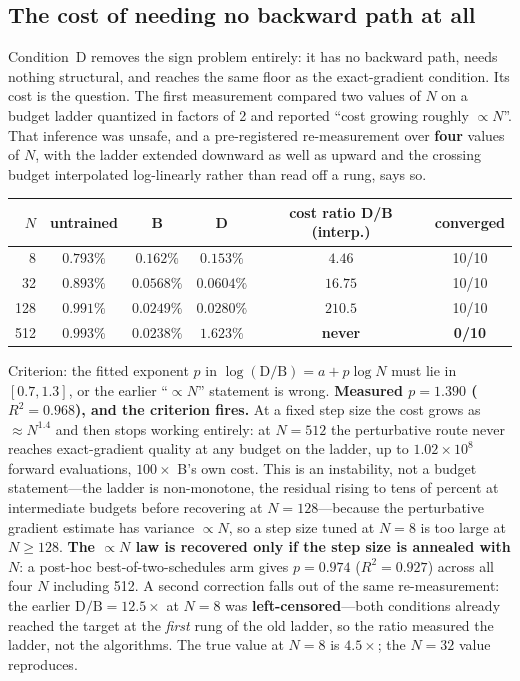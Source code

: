 \documentclass[11pt]{article}
\begin{document}
\subsection{The cost of needing no backward path at all}
\label{sec:pertcost}

Condition~D removes the sign problem entirely: it has no backward path, needs nothing structural, and reaches the same floor as the exact-gradient condition. Its cost is the question. The first measurement compared two values of $N$ on a budget ladder quantized in factors of 2 and reported ``cost growing roughly $\propto N$''. That inference was unsafe, and a pre-registered re-measurement over \textbf{four} values of $N$, with the ladder extended downward as well as upward and the crossing budget interpolated log-linearly rather than read off a rung, says so.

\begin{center}
\footnotesize
\begin{tabular}{rccccc}
\toprule
$N$ & untrained & B & D & cost ratio D/B (interp.) & converged \\
\midrule
8 & $0.793\%$ & $0.162\%$ & $0.153\%$ & $\mathbf{4.46}$ & 10/10 \\
32 & $0.893\%$ & $0.0568\%$ & $0.0604\%$ & $16.75$ & 10/10 \\
128 & $0.991\%$ & $0.0249\%$ & $0.0280\%$ & $210.5$ & 10/10 \\
512 & $0.993\%$ & $0.0238\%$ & $1.623\%$ & \textbf{never} & \textbf{0/10} \\
\bottomrule
\end{tabular}
\end{center}

Criterion: the fitted exponent $p$ in $\log(\mathrm{D/B}) = a + p\log N$ must lie in $[0.7, 1.3]$, or the earlier ``$\propto N$'' statement is wrong. \textbf{Measured $p = 1.390$ ($R^2 = 0.968$), and the criterion fires.} At a fixed step size the cost grows as ${\approx}N^{1.4}$ and then stops working entirely: at $N = 512$ the perturbative route never reaches exact-gradient quality at any budget on the ladder, up to $1.02\times10^8$ forward evaluations, $100\times$ B's own cost. This is an instability, not a budget statement---the ladder is non-monotone, the residual rising to tens of percent at intermediate budgets before recovering at $N=128$---because the perturbative gradient estimate has variance $\propto N$, so a step size tuned at $N = 8$ is too large at $N \ge 128$. \textbf{The $\propto N$ law is recovered only if the step size is annealed with $N$}: a post-hoc best-of-two-schedules arm gives $p = \mathbf{0.974}$ ($R^2 = 0.927$) across all four $N$ including 512. A second correction falls out of the same re-measurement: the earlier $\mathrm{D/B} = 12.5\times$ at $N = 8$ was \textbf{left-censored}---both conditions already reached the target at the \textit{first} rung of the old ladder, so the ratio measured the ladder, not the algorithms. The true value at $N=8$ is $\mathbf{4.5\times}$; the $N=32$ value reproduces.
\end{document}
